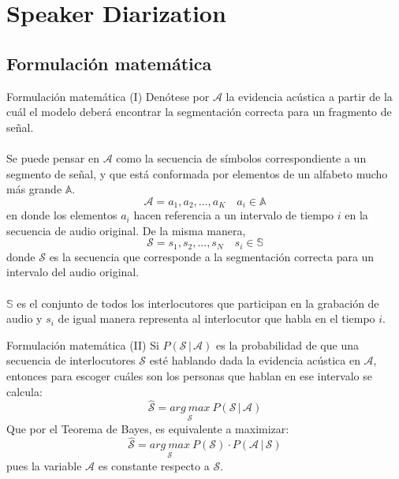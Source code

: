 
\section{Speaker Diarization}

\subsection{Formulación matemática}
\begin{frame}{Formulación matemática (I)}
Denótese por $\mathcal{A}$ la evidencia acústica a partir de la cuál el modelo deberá encontrar la segmentación correcta para un fragmento de señal.
\\~\\
Se puede pensar en $\mathcal{A}$ como la secuencia de símbolos correspondiente a un segmento de señal, y que está conformada por elementos de un alfabeto mucho más grande $\mathbb{A}$. 
\begin{equation}
\mathcal{A} = a_1, a_2, ..., a_K \quad a_i \in \mathbb{A}
\label{eqn:2a-1}
\end{equation}
en donde los elementos $a_i$ hacen referencia a un intervalo de tiempo $i$ en la secuencia de audio original.
\vfill
De la misma manera,
\begin{equation}
\mathcal{S} = s_1, s_2, ..., s_N \quad s_i \in \mathbb{S}
\label{eqn:2a-2}
\end{equation}
donde $\mathcal{S}$ es la secuencia que corresponde a la segmentación correcta para un intervalo del audio original. 
\\~\\
$\mathbb{S}$ es el conjunto de todos los interlocutores que participan en la grabación de audio y $s_i$ de igual manera representa al interlocutor que habla en el tiempo $i$.
\end{frame}

\begin{frame}{Formulación matemática (II)}
Si $P(\mathcal{S} \,|\, \mathcal{A})$ es la probabilidad de que una secuencia de interlocutores $\mathcal{S}$ esté hablando dada la evidencia acústica en $\mathcal{A}$, entonces para escoger cuáles son los personas que hablan en ese intervalo se calcula:
\begin{equation}
\hat{\mathcal{S}} = \underset{\mathcal{S}}{arg~max}~ P(\mathcal{S} \,|\, \mathcal{A})
\label{eqn:2a-3}
\end{equation}
\vfill
Que por el Teorema de Bayes, es equivalente a maximizar: 
\begin{equation}
\hat{\mathcal{S}} = \underset{\mathcal{S}}{arg~max}~ P(\mathcal{S}) \cdot P(\mathcal{A} \,|\, \mathcal{S})
\label{eqn:2a-6}
\end{equation}
pues la variable $\mathcal{A}$ es constante respecto a $\mathcal{S}$. %

\end{frame}

